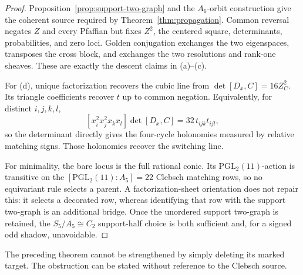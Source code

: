 \documentclass[11pt]{article}
\theoremstyle{definition}
\theoremstyle{remark}
\begin{document}
\begin{proof}
Proposition~\ref{prop:support-two-graph} and the \(A_6\)-orbit construction
give the coherent source required by Theorem~\ref{thm:propagation}.
Common reversal negates \(Z\) and every Pfaffian but fixes \(Z^2\), the
centered square, determinants, probabilities, and zero loci.  Golden
conjugation exchanges the two eigenspaces, transposes the cross block, and
exchanges the two resolutions and rank-one sheaves.  These are exactly the
descent claims in (a)--(c).

For (d), unique factorization recovers the cubic line from
\(\det[D_x,C]=16Z_C^2\).  Its triangle coefficients recover \(t\) up to
common negation.  Equivalently, for distinct \(i,j,k,l\),
\[
 [x_i^2x_j^2x_kx_l]\det[D_x,C]
   =32\,t_{ijk}t_{ijl},
\]
so the determinant directly gives the four-cycle holonomies measured by
relative matching signs.  Those holonomies recover the switching line.

For minimality, the bare locus is the full rational conic.  Its
\(\mathrm{PGL}_2(11)\)-action is transitive on the
\([\mathrm{PGL}_2(11):A_5]=22\) Clebsch matching rows, so no equivariant
rule selects a parent.  A factorization-sheet orientation does not repair
this: it selects a decorated row, whereas identifying that row with the
support two-graph is an additional bridge.  Once the unordered support
two-graph is retained, the \(S_5/A_5\cong C_2\) support-half choice is both
sufficient and, for a signed odd shadow, unavoidable.
\end{proof}

The preceding theorem cannot be strengthened by simply deleting its marked
target.  The obstruction can be stated without reference to the Clebsch
source.
\end{document}
